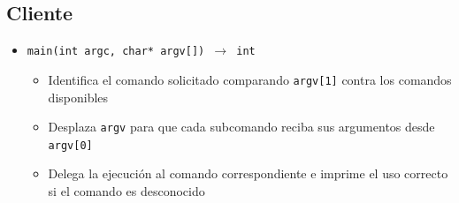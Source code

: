 \documentclass[12pt, letterpaper]{article}
\begin{document}
\subsection*{Cliente}
\begin{itemize}
    \item \texttt{main(int argc, char* argv[]) $\to$ int}
        \begin{itemize}
            \item Identifica el comando solicitado comparando 
                  \texttt{argv[1]} contra los comandos disponibles
            \item Desplaza \texttt{argv} para que cada subcomando reciba 
                  sus argumentos desde \texttt{argv[0]}
            \item Delega la ejecución al comando correspondiente e imprime 
                  el uso correcto si el comando es desconocido
        \end{itemize}


\end{itemize}
\end{document}
